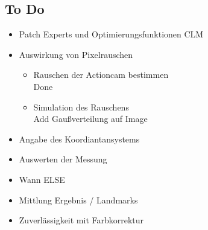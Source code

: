 \subsection{To Do}
\begin{itemize}
	\item Patch Experts und Optimierungsfunktionen CLM
	\item Auswirkung von Pixelrauschen
	\begin{itemize}
		\item Rauschen der Actioncam bestimmen\\
		Done
		\item Simulation des Rauschens\\
		Add Gaußverteilung auf Image 
	\end{itemize}
\item Angabe des Koordiantansystems
\item Auswerten der Messung
\item Wann ELSE
\item Mittlung Ergebnis / Landmarks
\item Zuverlässigkeit mit Farbkorrektur
\end{itemize}